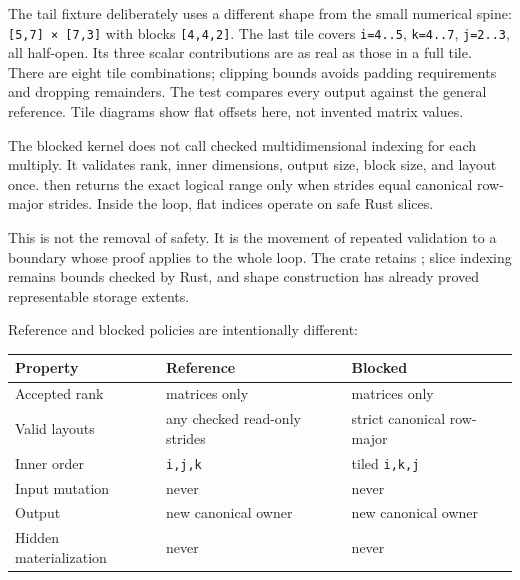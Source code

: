 The tail fixture deliberately uses a different shape from the small
numerical spine: \texttt{{[}5,7{]}\ ×\ {[}7,3{]}} with blocks
\texttt{{[}4,4,2{]}}. The last tile covers \texttt{i=4..5},
\texttt{k=4..7}, \texttt{j=2..3}, all half-open. Its three scalar
contributions are as real as those in a full tile. There are eight tile
combinations; clipping bounds avoids padding requirements and dropping
remainders. The test compares every output against the general
reference. Tile diagrams show flat offsets here, not invented matrix
values.

The blocked kernel does not call checked multidimensional indexing for
each multiply. It validates rank, inner dimensions, output size, block
size, and layout once.
\texttt{} then returns the
exact logical range only when strides equal canonical row-major strides.
Inside the loop, flat indices operate on safe Rust slices.

This is not the removal of safety. It is the movement of repeated
validation to a boundary whose proof applies to the whole loop. The
crate retains \texttt{}; slice
indexing remains bounds checked by Rust, and shape construction has
already proved representable storage extents.

Reference and blocked policies are intentionally different:


{\def\LTcaptype{none} %
\begin{longtable}[]{@{}
  >{\raggedright\arraybackslash}p{}
  >{\raggedright\arraybackslash}p{}
  >{\raggedright\arraybackslash}p{}@{}}
\toprule\noalign{}
\begin{minipage}[b]{\linewidth}\raggedright
Property
\end{minipage} & \begin{minipage}[b]{\linewidth}\raggedright
Reference
\end{minipage} & \begin{minipage}[b]{\linewidth}\raggedright
Blocked
\end{minipage} \\
\midrule\noalign{}
\endhead
\bottomrule\noalign{}
\endlastfoot
Accepted rank & matrices only & matrices only \\
Valid layouts & any checked read-only strides & strict canonical
row-major \\
Inner order & \texttt{i,j,k} & tiled \texttt{i,k,j} \\
Input mutation & never & never \\
Output & new canonical owner & new canonical owner \\
Hidden materialization & never & never \\
\end{longtable}
}

